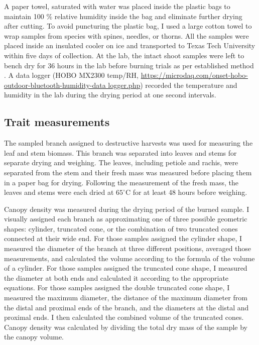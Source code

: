 \documentclass[12pt]{report}
\begin{document}
A paper towel, saturated with water was placed inside the plastic bags to maintain 100 \% relative humidity inside the bag and eliminate further drying after cutting. To avoid puncturing the plastic bag, I used a large cotton towel to wrap samples from species with spines, needles, or thorns. All the samples were placed inside an insulated cooler on ice and transported to Texas Tech University within five days of collection.  %
At the lab, the intact shoot samples were left to bench dry for 36 hours in the lab before burning trials  as per established method \citep{wyse2016quantitative}. %
A data logger (HOBO MX2300 temp/RH, 
\url{https://microdaq.com/onset-hobo-outdoor-bluetooth-humidity-data logger.php}) %
recorded the temperature and humidity in the lab during the drying period at one second intervals.

\subsection{Trait measurements}
The sampled branch assigned to destructive harvests was used for measuring the leaf and stem biomass.
This branch was separated into leaves and stems for separate drying and weighing. The leaves, including petiole and rachis, were separated from the stem and their fresh mass was measured before placing them in a paper bag for drying. Following the measurement of the fresh mass, the leaves and stems were each dried at $65^{\circ}$C for at least 48 hours before weighing.

Canopy density was measured during the drying period of the burned sample. I visually assigned each branch as approximating one of three possible geometric shapes: cylinder, truncated cone, or the combination of two truncated cones connected at their wide end. For those samples assigned the cylinder shape, I measured the diameter of the branch at three different positions, averaged those measurements, and calculated the volume according to the formula of the volume of a cylinder. For those samples assigned the truncated cone shape, I measured the diameter at both ends and calculated it according to the appropriate equations. For those samples assigned the double truncated cone shape, I measured the maximum diameter, the distance of the maximum diameter from the distal and proximal ends of the branch, and the diameters at the distal and proximal ends. I then calculated the combined volume of the truncated cones. Canopy density was calculated by dividing the total dry mass of the sample by the canopy volume.
\end{document}
